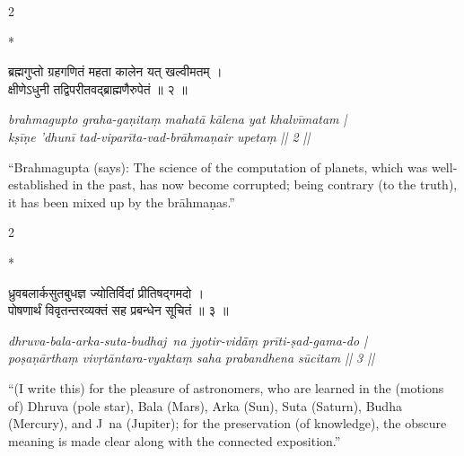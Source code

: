 \documentclass[11pt,a4paper]{article}
\newcommand{\dev}[1]{{\devanagarifont #1}}
\theoremstyle{definition}
\begin{document}
\vspace{0.3cm}

\begin{paracol}{2}

\switchcolumn[0]*\noindent
\begin{tcolorbox}[colback=sktbg,colframe=vertrule,boxrule=0.5pt,arc=3pt,title={\small\bfseries Verse 2}]
\dev{ब्रह्मगुप्तो ग्रहगणितं महता कालेन यत् खल्वीमतम् ।\\
क्षीणेऽधुनी तद्विपरीतवद्ब्राह्मणैरुपेतं ॥ २ ॥}
\end{tcolorbox}

\switchcolumn\noindent
\begin{tcolorbox}[colback=transbg,colframe=vertrule!60,boxrule=0.5pt,arc=3pt,title={\small\bfseries Translation 2}]
\textit{brahmagupto graha-ga\d{n}ita\d{m} mahat\=a k\=alena yat khalv\={i}matam |\\
k\d{s}\={i}\d{n}e 'dhun\={i} tad-vipar\={i}ta-vad-br\=ahma\d{n}air upeta\d{m} || 2 ||}

``Brahmagupta (says): The science of the computation of planets, which was well-established in the past, has now become corrupted; being contrary (to the truth), it has been mixed up by the br\=ahma\d{n}as.''
\end{tcolorbox}

\end{paracol}

\vspace{0.3cm}

\begin{paracol}{2}

\switchcolumn[0]*\noindent
\begin{tcolorbox}[colback=sktbg,colframe=vertrule,boxrule=0.5pt,arc=3pt,title={\small\bfseries Verse 3}]
\dev{ध्रुवबलार्कसुतबुधज्ञ ज्योतिर्विदां प्रीतिषद्गमदो ।\\
पोषणार्थं विवृतन्तरव्यक्तं सह प्रबन्धेन सूचितं ॥ ३ ॥}
\end{tcolorbox}

\switchcolumn\noindent
\begin{tcolorbox}[colback=transbg,colframe=vertrule!60,boxrule=0.5pt,arc=3pt,title={\small\bfseries Translation 3}]
\textit{dhruva-bala-arka-suta-budhaj~na jyotir-vid\=\=a\d{m} pr\={i}ti-\d{s}ad-gama-do |\\
po\d{s}a\d{n}\=artha\d{m} viv\d{r}t\=antara-vyakta\d{m} saha prabandhena s\=ucitam || 3 ||}

``(I write this) for the pleasure of astronomers, who are learned in the (motions of) Dhruva (pole star), Bala (Mars), Arka (Sun), Suta (Saturn), Budha (Mercury), and J~na (Jupiter); for the preservation (of knowledge), the obscure meaning is made clear along with the connected exposition.''
\end{tcolorbox}

\end{paracol}
\end{document}

